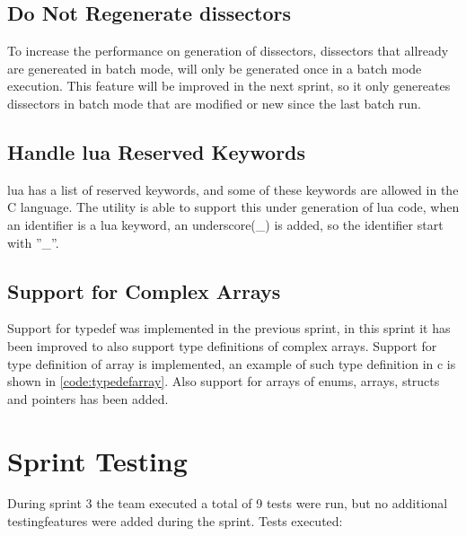 \subsection{Do Not Regenerate \glspl{dissector}}
To increase the performance on generation of dissectors, dissectors that 
allready are genereated in batch mode, will only be generated once in a batch 
mode execution. This feature will be improved in the next sprint, so it only 
genereates dissectors in batch mode that are modified or new since the last 
batch run.

\subsection{Handle \Gls{lua} Reserved Keywords}
\Gls{lua} has a list of reserved keywords, and some of these keywords are allowed in 
the C language. The \gls{utility} is able to support this under generation of \Gls{lua} 
code, when an identifier is a lua keyword, an underscore(\_) is added, so the 
identifier start with ''\_''.

\subsection{Support for Complex Arrays}
Support for typedef was implemented in the previous sprint, in this sprint it 
has been improved to also support type definitions of complex arrays. Support 
for type definition of array is implemented, an example of such type 
definition in c is shown in \autoref{code:typedefarray}. Also support for 
arrays of enums, arrays, structs and pointers has been added.



\section{Sprint Testing}
During sprint 3 the team executed a total of 9 tests were run, but no additional testingfeatures were added during the sprint. Tests executed:

